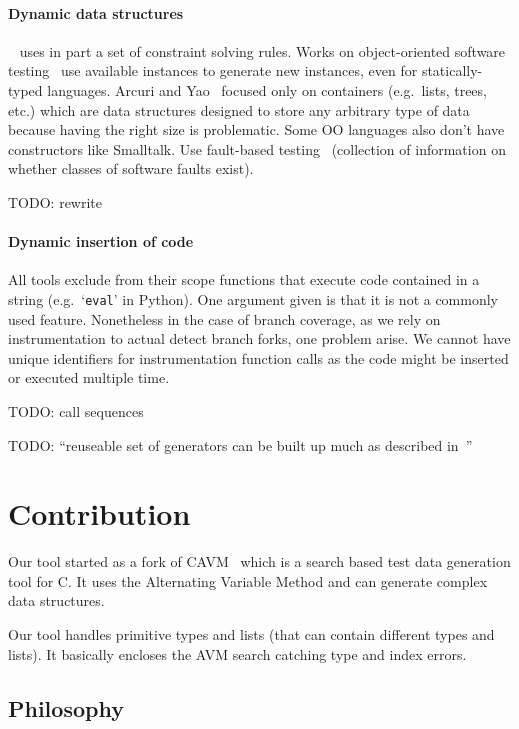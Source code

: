 \documentclass{llncs2e/llncs}
\makeatletter
\def\todo#1{{\color{red}TODO\@: #1}}
\makeatother
\begin{document}
\paragraph{Dynamic data structures}~\cite{lakhotia2008handling} uses in part a
set of constraint solving rules. Works on object-oriented software
testing~\cite{tonella2004evolutionary,ciupa2008artoo} use available instances to
generate new instances, even for statically-typed languages. Arcuri and
Yao~\cite{arcuri2008search} focused only on containers (e.g.\ lists, trees,
etc.) which are data structures designed to store any arbitrary type of data
because having the right size is problematic. Some OO languages also don't have
constructors like Smalltalk. Use fault-based testing~\cite{hayes1994testing}
(collection of information on whether classes of software faults exist).

\todo{rewrite}

\paragraph{Dynamic insertion of code} All tools exclude from their scope
functions that execute code contained in a string (e.g.\ `\texttt{eval}' in
Python). One argument given is that it is not a commonly used feature.
Nonetheless in the case of branch coverage, as we rely on instrumentation to
actual detect branch forks, one problem arise. We cannot have unique identifiers
for instrumentation function calls as the code might be inserted or executed
multiple time.

\todo{call sequences}

\todo{``reuseable set of generators can be built up much as described in~\cite{feldt2002biomimetic}''}

\section{Contribution}
\label{contribution}

Our tool started as a fork of CAVM~\cite{Kim2017ts} which is a search based test
data generation tool for C. It uses the Alternating Variable Method and can
generate complex data structures.

Our tool handles primitive types and lists (that can contain different types and
lists). It basically encloses the AVM search catching type and index errors.

\subsection{Philosophy}
\label{philosophy}
\end{document}
